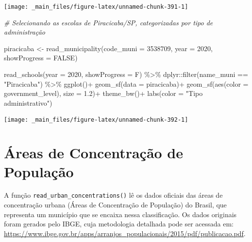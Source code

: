 \documentclass[
  brazilian,
]{book}
\newenvironment{Shaded}{\begin{snugshade}}{\end{snugshade}}
\newcommand{\AttributeTok}[1]{\textcolor[rgb]{0.77,0.63,0.00}{#1}}
\newcommand{\CommentTok}[1]{\textcolor[rgb]{0.56,0.35,0.01}{\textit{#1}}}
\newcommand{\ConstantTok}[1]{\textcolor[rgb]{0.00,0.00,0.00}{#1}}
\newcommand{\DecValTok}[1]{\textcolor[rgb]{0.00,0.00,0.81}{#1}}
\newcommand{\FloatTok}[1]{\textcolor[rgb]{0.00,0.00,0.81}{#1}}
\newcommand{\FunctionTok}[1]{\textcolor[rgb]{0.00,0.00,0.00}{#1}}
\newcommand{\NormalTok}[1]{#1}
\newcommand{\OtherTok}[1]{\textcolor[rgb]{0.56,0.35,0.01}{#1}}
\newcommand{\SpecialCharTok}[1]{\textcolor[rgb]{0.00,0.00,0.00}{#1}}
\newcommand{\StringTok}[1]{\textcolor[rgb]{0.31,0.60,0.02}{#1}}
\begin{document}
\begin{center}\texttt{[image: \_main\_files/figure-latex/unnamed-chunk-391-1]} \end{center}

\begin{Shaded}
\begin{Highlighting}[]
\CommentTok{\# Selecionando as escolas de Piracicaba/SP, categorizadas por tipo de administração}

\NormalTok{piracicaba }\OtherTok{\textless{}{-}} \FunctionTok{read\_municipality}\NormalTok{(}\AttributeTok{code\_muni =} \DecValTok{3538709}\NormalTok{,}
                                \AttributeTok{year =} \DecValTok{2020}\NormalTok{,}
                                \AttributeTok{showProgress =} \ConstantTok{FALSE}\NormalTok{)}

\FunctionTok{read\_schools}\NormalTok{(}\AttributeTok{year =} \DecValTok{2020}\NormalTok{,}
             \AttributeTok{showProgress =}\NormalTok{ F) }\SpecialCharTok{\%\textgreater{}\%}
\NormalTok{  dplyr}\SpecialCharTok{::}\FunctionTok{filter}\NormalTok{(name\_muni }\SpecialCharTok{==} \StringTok{"Piracicaba"}\NormalTok{) }\SpecialCharTok{\%\textgreater{}\%}
  \FunctionTok{ggplot}\NormalTok{()}\SpecialCharTok{+}
  \FunctionTok{geom\_sf}\NormalTok{(}\AttributeTok{data =}\NormalTok{ piracicaba)}\SpecialCharTok{+}
  \FunctionTok{geom\_sf}\NormalTok{(}\FunctionTok{aes}\NormalTok{(}\AttributeTok{color =}\NormalTok{ government\_level), }\AttributeTok{size =} \FloatTok{1.2}\NormalTok{)}\SpecialCharTok{+}
  \FunctionTok{theme\_bw}\NormalTok{()}\SpecialCharTok{+}
  \FunctionTok{labs}\NormalTok{(}\AttributeTok{color =} \StringTok{"Tipo administrativo"}\NormalTok{)}
\end{Highlighting}
\end{Shaded}

\begin{center}\texttt{[image: \_main\_files/figure-latex/unnamed-chunk-392-1]} \end{center}

\hypertarget{uxe1reas-de-concentrauxe7uxe3o-de-populauxe7uxe3o}{%
\section{Áreas de Concentração de População}\label{uxe1reas-de-concentrauxe7uxe3o-de-populauxe7uxe3o}}

A função \texttt{read\_urban\_concentrations()} lê os dados oficiais das áreas de concentração urbana (Áreas de Concentração de População) do Brasil, que representa um município que se encaixa nessa classificação. Os dados originais foram gerados pelo IBGE, cuja metodologia detalhada pode ser acessada em: \url{https://www.ibge.gov.br/apps/arranjos_populacionais/2015/pdf/publicacao.pdf}.
\end{document}
